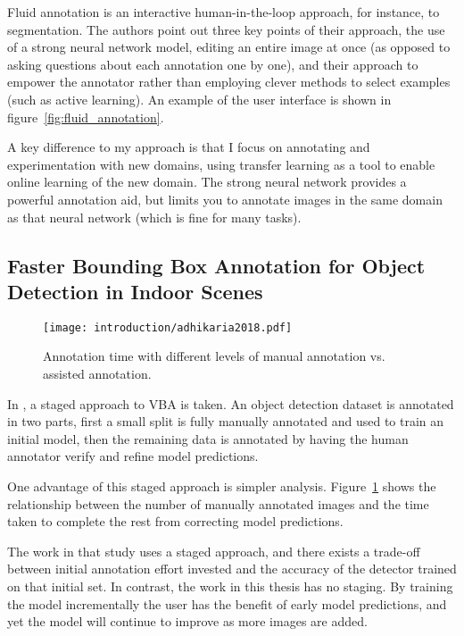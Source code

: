 Fluid annotation is an interactive human-in-the-loop approach, for instance, to segmentation. The authors point out three key points of their approach, the use of a strong neural network model, editing an entire image at once (as opposed to asking questions about each annotation one by one), and their approach to empower the annotator rather than employing clever methods to select examples (such as active learning). An example of the user interface is shown in figure~\ref{fig:fluid_annotation}.

A key difference to my approach is that I focus on annotating and experimentation with new domains, using transfer learning as a tool to enable online learning of the new domain. The strong neural network provides a powerful annotation aid, but limits you to annotate images in the same domain as that neural network (which is fine for many tasks).

\subsection{Faster Bounding Box Annotation for Object Detection in Indoor Scenes}

\begin{figure}[h]
  \centering
  \texttt{[image: introduction/adhikaria2018.pdf]}
  \caption{Annotation time with different levels of manual annotation vs. assisted annotation. \cite{Adhikaria2018}}  
  \label{fig:adhikaria2018}
\end{figure}

In \cite{Adhikaria2018}, a staged approach to \gls{VBA} is taken. An object detection dataset is annotated in two parts, first a small split is fully manually annotated and used to train an initial model, then the remaining data is annotated by having the human annotator verify and refine model predictions. 

One advantage of this staged approach is simpler analysis. Figure~\ref{fig:adhikaria2018} shows the relationship between the number of manually annotated images and the time taken to complete the rest from correcting model predictions.

The work in that study uses a staged approach, and there exists a trade-off between initial annotation effort invested and the accuracy of the detector trained on that initial set. In contrast, the work in this thesis has no staging. By training the model incrementally the user has the benefit of early model predictions, and yet the model will continue to improve as more images are added.

